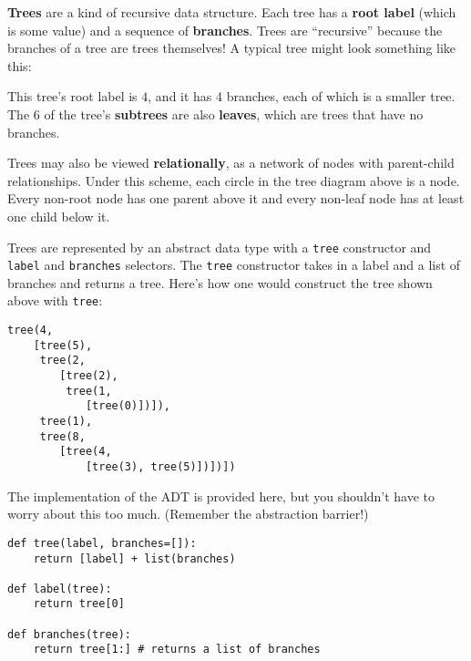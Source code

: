 \textbf{Trees} are a kind of recursive data structure. Each tree has a \textbf{root label} (which is some value) and a sequence of \textbf{branches}. Trees are ``recursive'' because the branches of a tree are trees themselves! A typical tree might look something like this: 

\begin{center}
\end{center}
This tree's root label is $4$, and it has 4 branches, each of which is a smaller tree. The $6$ of the tree's \textbf{subtrees} are also \textbf{leaves}, which are trees that have no branches. 

Trees may also be viewed \textbf{relationally}, as a network of nodes with parent-child relationships. Under this scheme, each circle in the tree diagram above is a node. Every non-root node has one parent above it and every non-leaf node has at least one child below it. 

Trees are represented by an abstract data type with a \lstinline{tree} constructor and \lstinline{label} and \lstinline{branches} selectors. The \lstinline{tree} constructor takes in a label and a list of branches and returns a tree. Here's how one would construct the tree shown above with \lstinline{tree}: 

\begin{lstlisting}
tree(4,
    [tree(5),
     tree(2,
        [tree(2),
         tree(1,
            [tree(0)])]),
     tree(1),
     tree(8,
        [tree(4,
            [tree(3), tree(5)])])])
\end{lstlisting}

The implementation of the ADT is provided here, but you shouldn't have to worry about this too much. (Remember the abstraction barrier!)

\begin{lstlisting}
def tree(label, branches=[]):
	return [label] + list(branches)

def label(tree):
	return tree[0] 

def branches(tree):
	return tree[1:] # returns a list of branches
		
	\end{lstlisting}


